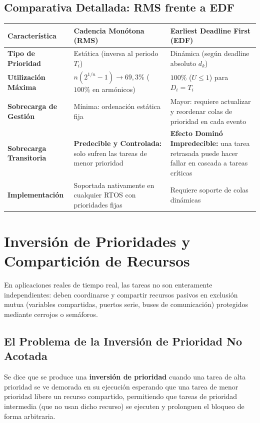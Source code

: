 \subsection{Comparativa Detallada: RMS frente a EDF}
\begin{table}[h!]
\centering
\small
\begin{tabular}{p{3.2cm}p{5.4cm}p{5.4cm}}
\toprule
\textbf{Característica} & \textbf{Cadencia Monótona (RMS)} & \textbf{Earliest Deadline First (EDF)} \\
\midrule
\textbf{Tipo de Prioridad} & Estática (inversa al periodo $T_i$) & Dinámica (según deadline absoluto $d_k$) \\
\textbf{Utilización Máxima} & $n(2^{1/n}-1) \to 69{,}3\%$ ($100\%$ en armónicos) & $100\%$ ($U \le 1$) para $D_i = T_i$ \\
\textbf{Sobrecarga de Gestión} & Mínima: ordenación estática fija & Mayor: requiere actualizar y reordenar colas de prioridad en cada evento \\
\textbf{Sobrecarga Transitoria} & \textbf{Predecible y Controlada:} solo sufren las tareas de menor prioridad & \textbf{Efecto Dominó Impredecible:} una tarea retrasada puede hacer fallar en cascada a tareas críticas \\
\textbf{Implementación} & Soportada nativamente en cualquier RTOS con prioridades fijas & Requiere soporte de colas dinámicas \\
\bottomrule
\end{tabular}
\end{table}

\section{Inversión de Prioridades y Compartición de Recursos}

En aplicaciones reales de tiempo real, las tareas no son enteramente independientes: deben coordinarse y compartir recursos pasivos en exclusión mutua (variables compartidas, puertos serie, buses de comunicación) protegidos mediante cerrojos o semáforos.

\subsection{El Problema de la Inversión de Prioridad No Acotada}
\begin{definicion}
Se dice que se produce una \textbf{inversión de prioridad} cuando una tarea de alta prioridad se ve demorada en su ejecución esperando que una tarea de menor prioridad libere un recurso compartido, permitiendo que tareas de prioridad intermedia (que no usan dicho recurso) se ejecuten y prolonguen el bloqueo de forma arbitraria.
\end{definicion}

